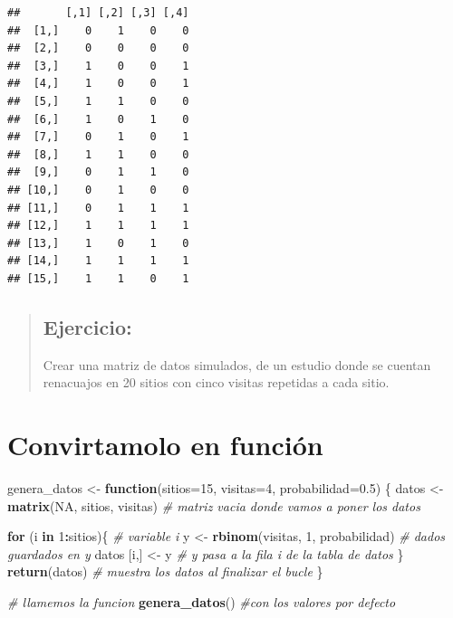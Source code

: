 \documentclass[
]{book}
\newenvironment{Shaded}{\begin{snugshade}}{\end{snugshade}}
\newcommand{\CommentTok}[1]{\textcolor[rgb]{0.56,0.35,0.01}{\textit{#1}}}
\newcommand{\ControlFlowTok}[1]{\textcolor[rgb]{0.13,0.29,0.53}{\textbf{#1}}}
\newcommand{\DataTypeTok}[1]{\textcolor[rgb]{0.13,0.29,0.53}{#1}}
\newcommand{\DecValTok}[1]{\textcolor[rgb]{0.00,0.00,0.81}{#1}}
\newcommand{\FloatTok}[1]{\textcolor[rgb]{0.00,0.00,0.81}{#1}}
\newcommand{\KeywordTok}[1]{\textcolor[rgb]{0.13,0.29,0.53}{\textbf{#1}}}
\newcommand{\NormalTok}[1]{#1}
\newcommand{\OperatorTok}[1]{\textcolor[rgb]{0.81,0.36,0.00}{\textbf{#1}}}
\newcommand{\OtherTok}[1]{\textcolor[rgb]{0.56,0.35,0.01}{#1}}
\newcommand{\StringTok}[1]{\textcolor[rgb]{0.31,0.60,0.02}{#1}}
\begin{document}
\begin{verbatim}
##       [,1] [,2] [,3] [,4]
##  [1,]    0    1    0    0
##  [2,]    0    0    0    0
##  [3,]    1    0    0    1
##  [4,]    1    0    0    1
##  [5,]    1    1    0    0
##  [6,]    1    0    1    0
##  [7,]    0    1    0    1
##  [8,]    1    1    0    0
##  [9,]    0    1    1    0
## [10,]    0    1    0    0
## [11,]    0    1    1    1
## [12,]    1    1    1    1
## [13,]    1    0    1    0
## [14,]    1    1    1    1
## [15,]    1    1    0    1
\end{verbatim}

\begin{quote}
\hypertarget{ejercicio-1}{%
\subsection{Ejercicio:}\label{ejercicio-1}}

Crear una matriz de datos simulados, de un estudio donde se cuentan renacuajos en 20 sitios con cinco visitas repetidas a cada sitio.
\end{quote}

\hypertarget{convirtamolo-en-funciuxf3n}{%
\section{Convirtamolo en función}\label{convirtamolo-en-funciuxf3n}}

\begin{Shaded}
\begin{Highlighting}[]
\NormalTok{genera_datos <-}\StringTok{ }\ControlFlowTok{function}\NormalTok{(}\DataTypeTok{sitios=}\DecValTok{15}\NormalTok{, }\DataTypeTok{visitas=}\DecValTok{4}\NormalTok{, }\DataTypeTok{probabilidad=}\FloatTok{0.5}\NormalTok{) \{}
\NormalTok{  datos <-}\StringTok{ }\KeywordTok{matrix}\NormalTok{(}\OtherTok{NA}\NormalTok{, sitios, visitas) }\CommentTok{# matriz vacia donde vamos a poner los datos}
  
  \ControlFlowTok{for}\NormalTok{ (i }\ControlFlowTok{in} \DecValTok{1}\OperatorTok{:}\NormalTok{sitios)\{     }\CommentTok{# variable i }
\NormalTok{    y <-}\StringTok{ }\KeywordTok{rbinom}\NormalTok{(visitas, }\DecValTok{1}\NormalTok{, probabilidad) }\CommentTok{# dados guardados en y}
\NormalTok{    datos [i,] <-}\StringTok{ }\NormalTok{y       }\CommentTok{# y pasa a la fila i de la tabla de datos}
\NormalTok{  \}  }
  \KeywordTok{return}\NormalTok{(datos) }\CommentTok{# muestra los datos al finalizar el bucle}
\NormalTok{\}                  }


\CommentTok{# llamemos la funcion }
\KeywordTok{genera_datos}\NormalTok{() }\CommentTok{#con los valores por defecto}
\end{Highlighting}
\end{Shaded}
\end{document}
